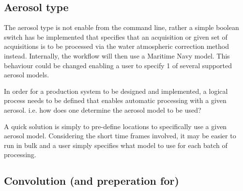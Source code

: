 \documentclass[a4paper]{article}
\begin{document}
  \subsection{Aerosol type}
    \begin{flushleft}
      The aerosol type is not enable from the command line, rather a simple boolean switch has be implemented that specifies that an acquisition or given set of acquisitions is to be processed via the water atmospheric correction method instead. Internally, the workflow will then use a Maritime Navy model. This behaviour could be changed enabling a user to specify 1 of several supported aerosol models. \par
      In order for a production system to be designed and implemented, a logical process needs to be defined that enables automatic processing with a given aerosol. i.e. how does one determine the aerosol model to be used? \par
      A quick solution is simply to pre-define locations to specifically use a given aerosol model. Considering the short time frames involved, it may be easier to run in bulk and a user simply specifies what model to use for each batch of processing.
    \end{flushleft}

  \subsection{Convolution (and preperation for)}
\end{document}
